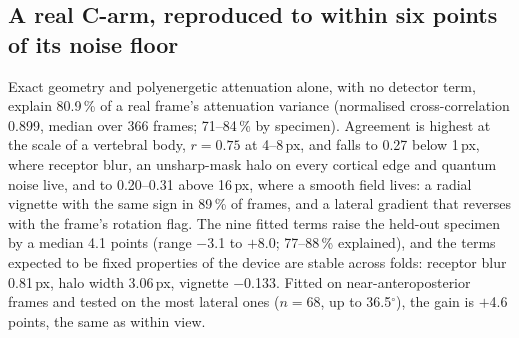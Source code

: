 \documentclass[11pt,letterpaper]{article}
\begin{document}
\subsection*{A real C-arm, reproduced to within six points of its noise floor}
Exact geometry and polyenergetic attenuation alone, with no detector term, explain 80.9\,\% of a real
frame's attenuation variance (normalised cross-correlation 0.899, median over 366 frames; 71--84\,\%
by specimen). Agreement is highest at the scale of a vertebral body, $r=0.75$ at 4--8\,px, and falls
to 0.27 below 1\,px, where receptor blur, an unsharp-mask halo on every cortical edge and quantum
noise live, and to 0.20--0.31 above 16\,px, where a smooth field lives: a radial vignette with the
same sign in 89\,\% of frames, and a lateral gradient that reverses with the frame's rotation flag.
The nine fitted terms raise the held-out specimen by a median 4.1 points (range $-$3.1 to $+$8.0;
77--88\,\% explained), and the terms expected to be fixed properties of the device are stable across
folds: receptor blur 0.81\,px, halo width 3.06\,px, vignette $-$0.133. Fitted on near-anteroposterior
frames and tested on the most lateral ones ($n=68$, up to 36.5$^\circ$), the gain is $+$4.6 points,
the same as within view.
\end{document}
